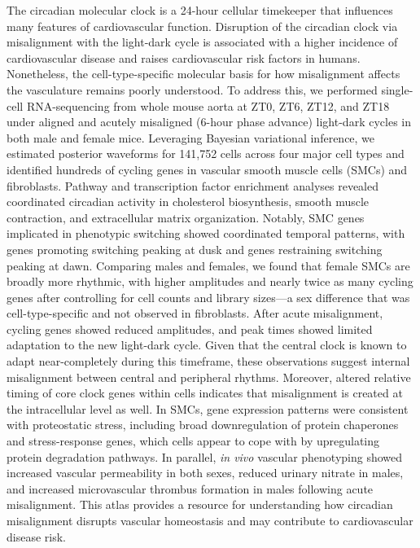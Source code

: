 \documentclass[12pt]{article}
\begin{document}
The circadian molecular clock is a 24-hour cellular timekeeper that influences many features of
cardiovascular function. Disruption of the circadian clock via misalignment with the light-dark
cycle is associated with a higher incidence of cardiovascular disease and raises cardiovascular risk
factors in humans. Nonetheless, the cell-type-specific molecular basis for how misalignment affects
the vasculature remains poorly understood. To address this, we performed single-cell RNA-sequencing
from whole mouse aorta at ZT0, ZT6, ZT12, and ZT18 under aligned and acutely misaligned (6-hour
phase advance) light-dark cycles in both male and female mice. Leveraging Bayesian variational
inference, we estimated posterior waveforms for 141,752 cells across four major cell types and
identified hundreds of cycling genes in vascular smooth muscle cells (SMCs) and
fibroblasts. Pathway and transcription factor enrichment analyses revealed coordinated circadian
activity in cholesterol biosynthesis, smooth muscle contraction, and extracellular matrix organization.
Notably, SMC genes implicated in phenotypic switching showed coordinated temporal patterns, with
genes promoting switching peaking at dusk and genes restraining switching peaking at dawn. Comparing
males and females, we found that female SMCs are broadly more rhythmic, with higher amplitudes and
nearly twice as many cycling genes after controlling for cell counts and library sizes---a sex
difference that was cell-type-specific and not observed in fibroblasts. After acute misalignment,
cycling genes showed reduced amplitudes, and peak times showed limited adaptation to the new
light-dark cycle. Given that the central clock is known to adapt near-completely during this
timeframe, these observations suggest internal misalignment between central and peripheral rhythms.
Moreover, altered relative timing of core clock genes within cells indicates that misalignment is
created at the intracellular level as well. In SMCs, gene expression patterns were consistent with
proteostatic stress, including broad downregulation of protein chaperones and stress-response genes,
which cells appear to cope with by upregulating protein degradation pathways. 
In parallel, \textit{in vivo} vascular phenotyping showed increased vascular permeability in both sexes, reduced urinary nitrate in males, and increased microvascular thrombus formation in males following acute misalignment.
This atlas provides a resource for understanding how circadian misalignment disrupts vascular homeostasis and may contribute to cardiovascular disease risk.
\end{document}
